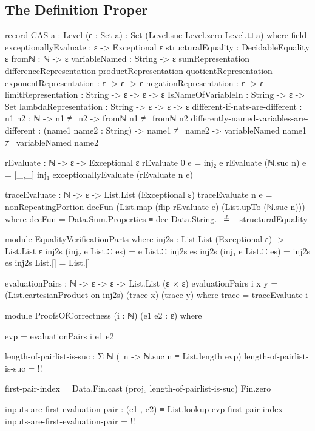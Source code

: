 \documentclass{report}
\begin{document}
\subsection{The Definition Proper}

\begin{code}
record CAS {a : Level} (ε : Set a) : Set (Level.suc Level.zero Level.⊔ a) where
  field
    exceptionallyEvaluate : ε -> Exceptional ε
    structuralEquality : DecidableEquality ε
    fromℕ : ℕ -> ε
    variableNamed : String -> ε
    sumRepresentation
     differenceRepresentation
     productRepresentation
     quotientRepresentation
     exponentRepresentation : ε -> ε -> ε
    negationRepresentation : ε -> ε
    limitRepresentation : String -> ε -> ε -> ε
    IsNameOfVariableIn : String -> ε -> Set
    lambdaRepresentation : String -> ε -> ε -> ε
    different-if-nats-are-different :
      {n1 n2 : ℕ} -> n1 ≢ n2 -> fromℕ n1 ≢ fromℕ n2
    differently-named-variables-are-different :
      (name1 name2 : String) ->
      name1 ≢ name2 ->
      variableNamed name1 ≢ variableNamed name2

  rEvaluate : ℕ -> ε -> Exceptional ε
  rEvaluate 0 e = inj₂ e
  rEvaluate (ℕ.suc n) e = [_,_] inj₁ exceptionallyEvaluate (rEvaluate n e)

  traceEvaluate : ℕ -> ε -> List.List (Exceptional ε)
  traceEvaluate n e =
    nonRepeatingPortion decFun (List.map (flip rEvaluate e) (List.upTo (ℕ.suc n)))
      where decFun = Data.Sum.Properties.≡-dec Data.String._≟_ structuralEquality

  module EqualityVerificationParts where
    inj2s : List.List (Exceptional ε) -> List.List ε
    inj2s (inj₂ e List.∷ es) = e List.∷ inj2s es
    inj2s (inj₁ e List.∷ es) = inj2s es
    inj2s List.[] = List.[]

    evaluationPairs : ℕ -> ε -> ε -> List.List (ε × ε)
    evaluationPairs i x y = (List.cartesianProduct on inj2s) (trace x) (trace y)
      where
      trace = traceEvaluate i

    module ProofsOfCorrectness
      (i : ℕ)
      (e1 e2 : ε) where

      evp = evaluationPairs i e1 e2

      length-of-pairlist-is-suc : Σ ℕ (\ n -> ℕ.suc n ≡ List.length evp)
      length-of-pairlist-is-suc = {!!}

      first-pair-index = Data.Fin.cast (proj₂ length-of-pairlist-is-suc) Fin.zero

      inputs-are-first-evaluation-pair :
        (e1 , e2) ≡ List.lookup evp first-pair-index
      inputs-are-first-evaluation-pair = {!!}


\end{code}
\end{document}
